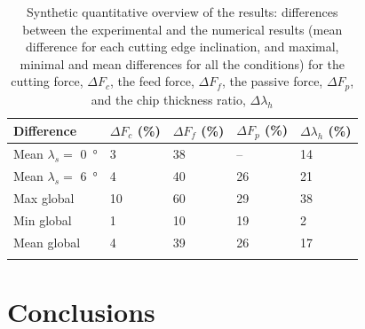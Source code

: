 \documentclass[preprint,12pt,times]{elsarticle}
\begin{document}
%
\begin{table}[!h]
\begin{center}
\caption{\label{tab:Synth} Synthetic quantitative overview of the results: differences between the experimental and the numerical results (mean difference for each cutting edge inclination, and maximal, minimal and mean differences for all the conditions) for the cutting force, $\Delta F_c$, the feed force, $\Delta F_f$, the passive force, $\Delta F_p$, and the chip thickness ratio, $\Delta \lambda_h$}
\begin{tabular}{lllll}
\hline\noalign{\smallskip}
Difference & $\Delta F_c$ (\%) & $\Delta F_f$ (\%) & $\Delta F_p$ (\%) & $\Delta \lambda_h$ (\%)\\
\hline\noalign{\smallskip}
Mean $\lambda_s =$ \qty{0}{\degree} & 3 & 38 & -- & 14\\
Mean $\lambda_s =$ \qty{6}{\degree} & 4 & 40 & 26 & 21\\
Max global & 10 & 60 & 29 & 38\\
Min global & 1 & 10 & 19 & 2\\
Mean global & 4 & 39 & 26 & 17\\
\noalign{\smallskip}\hline\noalign{\smallskip}
\end{tabular}
\end{center}
\end{table}
%

\section{Conclusions}
\end{document}
